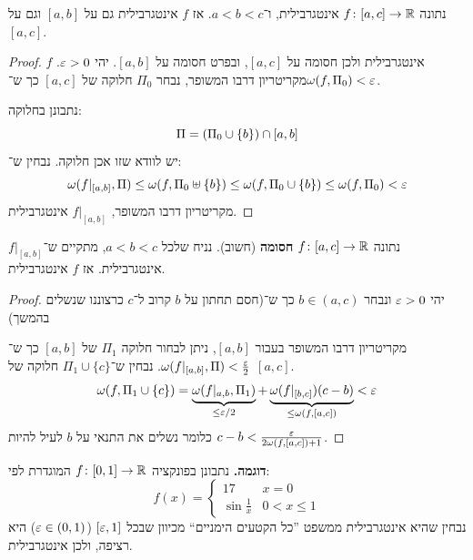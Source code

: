 \documentclass[]{../../../../tex/classes/styledArticle}
\begin{document}
	\begin{Theorem}[תת־קטע]
		נתונה $f \colon [a, c] \to \mathbb{R}$ אינטגרבילית, ו־$a < b < c$. אז $f$ אינטגרבילית גם על $[a, b]$ וגם על $[a, c]$. 
	\end{Theorem}
	\begin{proof}
		$f$ אינטגרבילית ולכן חסומה על $[a, c]$, ובפרט חסומה על $[a, b]$. יהי $\eg > 0$. מקריטריון דרבו המשופר, נבחר $\Pi_0$ חלוקה של $[a, c]$ כך ש־$\wg(f, \Pi_0) < \eg$. 
		
		נתבונן בחלוקה: 
		\[ \Pi = \left ( \Pi_0 \cup \{b\} \right ) \cap [a, b] \]
		יש לוודא שזו אכן חלוקה. נבחין ש־: 
		\[ \wg(f|_{[a, b]}, \Pi) \le \wg(f, \Pi_0 \uplus \{b\}) \le \wg(f, \Pi_0 \cup \{b\}) \le \wg(f, \Pi_0) < \eg \]
		מקריטריון דרבו המשופר, $f|_{[a, b]}$ אינטגרבילית. 
	\end{proof}
	
	\begin{Theorem}
		נתונה $f \colon [a, c] \to \mathbb{R}$ \textbf{חסומה} (חשוב). נניח שלכל $a < b < c$, מתקיים ש־$f|_{[a, b]}$ אינטגרבילית. אז $f$ אינטגרבילית. 
	\end{Theorem}
	\begin{proof}
		יהי $\eg > 0$ ונבחר $b \in (a, c)$ כך ש־(חסם תחתון על $b$ קרוב ל־$c$ כרצוננו שנשלים בהמשך)
		
		מקריטריון דרבו המשופר בעבור $[a, b]$, ניתן לבחור חלוקה $\Pi_1$ של $[a, b]$ כך ש־$\wg(f|_{[a, b]}, \Pi) < \frac{\eg}{2}$. נבחין ש־$\Pi_1 \cup \{c\}$ חלוקה של $[a, c]$. 
		\[ \wg(f, \Pi_1 \cup \{c\}) = \underbrace{\wg(f|_{a, b}, \Pi_1)}_{\le \eg/2} + \underbrace{\wg(f|_{[b, c]})(c - b)}_{\le \wg(f, [a, c])} < \eg \]
		כלומר נשלים את התנאי על $b$ לעיל להיות $c - b < \frac{\eg}{2\wg(f, [a, c]) + 1}$. 
	\end{proof}
	
	
	\textbf{דוגמה. }נתבונן בפונקציה $f \colon [0, 1] \to \mathbb{R}$ המוגדרת לפי: 
	\[ f(x) = \begin{cases}
		17 & x = 0 \\
		\sin \frac{1}{x} & 0 < x \le 1
	\end{cases} \]
	נבחין שהיא אינטגרבילית ממשפט ''כל הקטעים הימניים`` מכיוון שבכל $[\eg, 1]$ ($\eg \in (0, 1)$) היא רציפה, ולכן אינטגרבילית. 
	
	
	\ndoc
	
	
	
	
\end{document}
